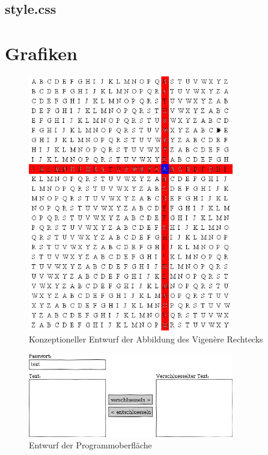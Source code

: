 \documentclass[11pt,paper=a4,final]{scrartcl}
\begin{document}
\subsection{style.css}
\lstset{language=CSS,frame=single,breaklines=true}

\newpage
\section{Grafiken}
\label{sec:grafiken}
\begin{figure}[h!]
  \centering
  \includegraphics[width=0.8\textwidth]{select.png}
  \caption{Konzeptioneller Entwurf der Abbildung des Vigen\`ere Rechtecks}
  \label{fig:select}
\end{figure}
\newpage
\begin{figure}[h!]
  \centering
  \includegraphics[width=0.8\textwidth]{interface.png}
  \caption{Entwurf der Programmoberfl\"ache}
  \label{fig:interface}
\end{figure}
\end{document}

